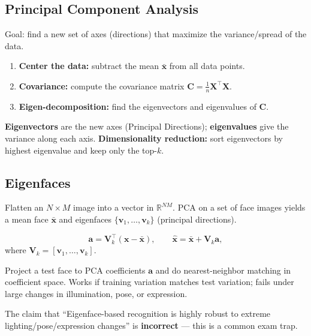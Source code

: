 \documentclass[11pt, oneside]{book}
\newcommand{\R}{\mathbb{R}}
\newcommand{\vct}[1]{\bm{#1}}           %
\newcommand{\mat}[1]{\mathbf{#1}}       %
\begin{document}
\subsection{Principal Component Analysis}

\begin{thmbox}[title={PCA Recipe}]
Goal: find a new set of axes (directions) that maximize the variance/spread of the data.
\begin{enumerate}
  \item \textbf{Center the data:} subtract the mean $\bar{\vct{x}}$ from all data points.
  \item \textbf{Covariance:} compute the covariance matrix $\mat{C} = \frac{1}{n}\mat{X}^\top\mat{X}$.
  \item \textbf{Eigen-decomposition:} find the eigenvectors and eigenvalues of $\mat{C}$.
\end{enumerate}
\textbf{Eigenvectors} are the new axes (Principal Directions); \textbf{eigenvalues} give the variance along each axis.
\textbf{Dimensionality reduction:} sort eigenvectors by highest eigenvalue and keep only the top-$k$.
\end{thmbox}

\subsection{Eigenfaces}

Flatten an $N\times M$ image into a vector in $\R^{NM}$. PCA on a set of face images yields a mean face
$\bar{\vct{x}}$ and eigenfaces $\{\vct{v}_1,\dots,\vct{v}_k\}$ (principal directions).

\begin{thmbox}[title={Projection and Reconstruction}]
\[
\vct{a} = \mat{V}_k^\top (\vct{x}-\bar{\vct{x}}),
\qquad
\hat{\vct{x}} = \bar{\vct{x}} + \mat{V}_k \vct{a},
\]
where $\mat{V}_k=[\vct{v}_1,\dots,\vct{v}_k]$.
\end{thmbox}

\begin{exbox}[title={Recognition via Eigenfaces}]
Project a test face to PCA coefficients $\vct{a}$ and do nearest-neighbor matching in coefficient space.
Works if training variation matches test variation; fails under large changes in illumination, pose, or expression.
\end{exbox}

The claim that ``Eigenface-based recognition is highly robust to extreme lighting/pose/expression changes''
is \textbf{incorrect} --- this is a common exam trap.
\end{document}
